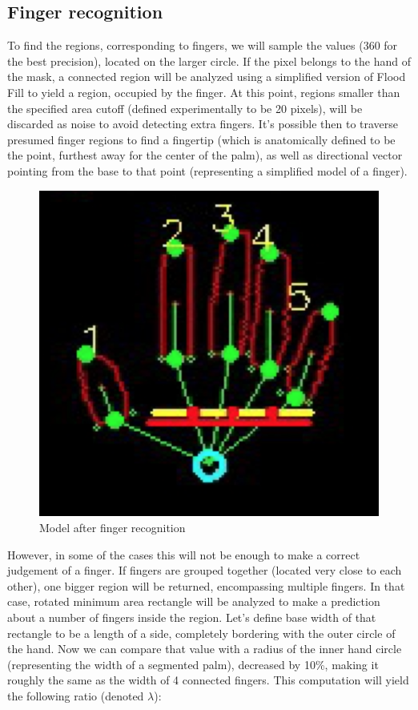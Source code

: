 \documentclass[a4paper,11pt,oneside]{article}
\begin{document}
\subsection{Finger recognition}

To find the regions, corresponding to fingers, we will sample the values (360 for the best precision), located on the larger circle. If the pixel belongs to the hand of the mask, a connected region will be analyzed using a simplified version of Flood Fill to yield a region, occupied by the finger. At this point, regions smaller than the specified area cutoff (defined experimentally to be 20 pixels), will be discarded as noise to avoid detecting extra fingers. It's possible then to traverse presumed finger regions to find a fingertip (which is anatomically defined to be the point, furthest away for the center of the palm), as well as directional vector pointing from the base to that point (representing a simplified model of a finger).\\

 \begin{figure}[H]
  \centering
  \includegraphics[scale=0.7]{hand-recognized.png}
  \caption{Model after finger recognition}
  \end{figure}

However, in some of the cases this will not be enough to make a correct judgement of a finger. If fingers are grouped together (located very close to each other), one bigger region will be returned, encompassing multiple fingers. In that case, rotated minimum area rectangle will be analyzed to make a prediction about a number of fingers inside the region. Let's define base width of that rectangle to be a length of a side, completely bordering with the outer circle of the hand. Now we can compare that value with a radius of the inner hand circle (representing the width of a segmented palm), decreased by 10\%, making it roughly the same as the width of 4 connected fingers. This computation will yield the following ratio (denoted $\lambda$):
\end{document}
